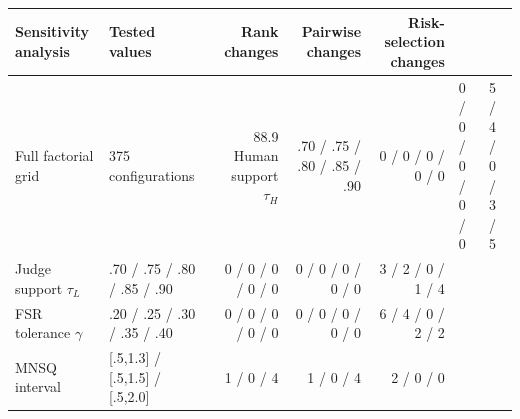 \begin{tabular}{llrrr}
\toprule
Sensitivity analysis & Tested values & Rank changes & Pairwise changes & Risk-selection changes \\
\midrule
Full factorial grid & 375 configurations & 88.9%
Human support $\tau_H$ & .70 / .75 / .80 / .85 / .90 & 0 / 0 / 0 / 0 / 0 & 0 / 0 / 0 / 0 / 0 & 5 / 4 / 0 / 3 / 5 \\
Judge support $\tau_L$ & .70 / .75 / .80 / .85 / .90 & 0 / 0 / 0 / 0 / 0 & 0 / 0 / 0 / 0 / 0 & 3 / 2 / 0 / 1 / 4 \\
FSR tolerance $\gamma$ & .20 / .25 / .30 / .35 / .40 & 0 / 0 / 0 / 0 / 0 & 0 / 0 / 0 / 0 / 0 & 6 / 4 / 0 / 2 / 2 \\
MNSQ interval & [.5,1.3] / [.5,1.5] / [.5,2.0] & 1 / 0 / 4 & 1 / 0 / 4 & 2 / 0 / 0 \\
\bottomrule
\end{tabular}
